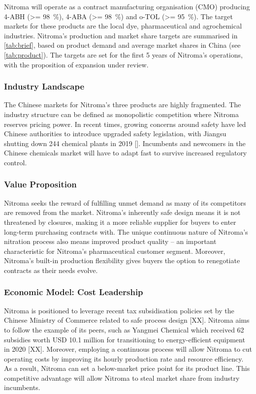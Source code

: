 Nitroma will operate as a contract manufacturing organisation (CMO) producing 4-ABH (\SI{>= 98}{\percent}), 4-ABA (\SI{>= 98}{\percent}) and o-TOL (\SI{>= 95}{\percent}). The target markets for these products are the local dye, pharmaceutical and agrochemical industries. Nitroma’s production and market share targets are summarised in \cref{tab:brief}, based on product demand and average market shares in China (see \cref{tab:product}). The targets are set for the first 5 years of Nitroma’s operations, with the proposition of expansion under review.


\subsubsection{Industry Landscape}
The Chinese markets for Nitroma’s three products are highly fragmented. The industry structure can be defined as monopolistic competition where Nitroma reserves pricing power. In recent times, growing concerns around safety have led Chinese authorities to introduce upgraded safety legislation, with Jiangsu shutting down 244 chemical plants in 2019 []. Incumbents and newcomers in the Chinese chemicals market will have to adapt fast to survive increased regulatory control.


\subsubsection{Value Proposition}
Nitroma seeks the reward of fulfilling unmet demand as many of its competitors are removed from the market. Nitroma’s inherently safe design means it is not threatened by closures, making it a more reliable supplier for buyers to enter long-term purchasing contracts with. The unique continuous nature of Nitroma’s nitration process also means improved product quality – an important characteristic for Nitroma’s pharmaceutical customer segment. Moreover, Nitroma’s built-in production flexibility gives buyers the option to renegotiate contracts as their needs evolve. %

\subsubsection{Economic Model: Cost Leadership}
Nitroma is positioned to leverage recent tax subsidisation policies set by the Chinese Ministry of Commerce related to safe process design [XX]. Nitroma aims to follow the example of its peers, such as Yangmei Chemical which received 62 subsidies worth USD 10.1 million for transitioning to energy-efficient equipment in 2020 [XX]. Moreover, employing a continuous process will allow Nitroma to cut operating costs by improving its hourly production rate and resource efficiency. As a result, Nitroma can set a below-market price point for its product line. This competitive advantage will allow Nitroma to steal market share from industry incumbents. 

